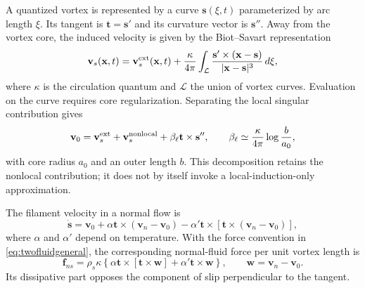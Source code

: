 \documentclass[11pt]{article}
\numberwithin{equation}{section}
\begin{document}
A quantized vortex is represented by a curve $\mathbf s(\xi,t)$ parameterized by arc length $\xi$. Its tangent is $\mathbf t=\mathbf s'$ and its curvature vector is $\mathbf s''$. Away from the vortex core, the induced velocity is given by the Biot--Savart representation
\begin{equation}
 \mathbf v_s(\mathbf x,t)=\mathbf v_s^{\rm ext}(\mathbf x,t)
 +\frac{\kappa}{4\pi}\int_{\mathcal L}
 \frac{\mathbf s'\times(\mathbf x-\mathbf s)}{|\mathbf x-\mathbf s|^3}
 \,d\xi,
 \label{eq:biotsavart}
\end{equation}
where $\kappa$ is the circulation quantum and $\mathcal L$ the union of vortex curves. Evaluation on the curve requires core regularization. Separating the local singular contribution gives
\begin{equation}
 \mathbf v_0=\mathbf v_s^{\rm ext}+\mathbf v_s^{\rm nonlocal}
       +\beta_\ell\mathbf t\times\mathbf s'',
 \qquad
 \beta_\ell\simeq\frac{\kappa}{4\pi}\log\frac{b}{a_0},
 \label{eq:localinduction}
\end{equation}
with core radius $a_0$ and an outer length $b$. This decomposition retains the nonlocal contribution; it does not by itself invoke a local-induction-only approximation.

The filament velocity in a normal flow is \citep{Schwarz1985,Schwarz1988}
\begin{equation}
 \dot{\mathbf s}=\mathbf v_0
 +\alpha\mathbf t\times(\mathbf v_n-\mathbf v_0)
 -\alpha'\mathbf t\times[\mathbf t\times(\mathbf v_n-\mathbf v_0)],
 \label{eq:filament}
\end{equation}
where $\alpha$ and $\alpha'$ depend on temperature. With the force convention in \eqref{eq:twofluidgeneral}, the corresponding normal-fluid force per unit vortex length is
\begin{equation}
 \mathbf f_{ns}=\rho_s\kappa\left\{
 \alpha\mathbf t\times[\mathbf t\times\mathbf w]
 +\alpha'\mathbf t\times\mathbf w\right\},
 \qquad \mathbf w=\mathbf v_n-\mathbf v_0.
 \label{eq:lineforce}
\end{equation}
Its dissipative part opposes the component of slip perpendicular to the tangent.
\end{document}
